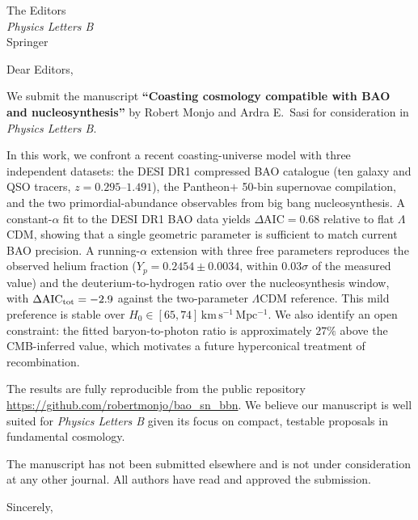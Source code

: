 \documentclass[12pt,a4paper]{letter}
\date{September 2026}
\begin{document}
\begin{letter}{The Editors\\
  \textit{Physics Letters B}\\
  Springer}

\opening{Dear Editors,}

We submit the manuscript \textbf{``Coasting cosmology compatible with BAO and nucleosynthesis''} by Robert Monjo and Ardra E.\ Sasi for consideration in \textit{Physics Letters B}.

In this work, we confront a recent coasting-universe model with three independent datasets: the DESI
DR1 compressed BAO catalogue (ten galaxy and QSO tracers, $z=0.295$--$1.491$), the Pantheon$+$ 50-bin supernovae compilation, and the two primordial-abundance
observables from big bang nucleosynthesis. A constant-$\alpha$ fit to the DESI
DR1 BAO data yields $\Delta\mathrm{AIC}=0.68$ relative to flat $\Lambda$CDM,
showing that a single geometric parameter is sufficient to match current BAO
precision. A running-$\alpha$ extension with three free parameters reproduces
the observed helium fraction ($Y_p=0.2454\pm0.0034$, within $0.03\sigma$ of the
measured value) and the deuterium-to-hydrogen ratio over the nucleosynthesis
window, with $\Delta\mathrm{AIC}_{\rm tot}=-2.9$ against the two-parameter
$\Lambda$CDM reference. This mild preference is stable over
$H_0\in[65,74]\,\mathrm{km\,s^{-1}\,Mpc^{-1}}$. We also identify an open
constraint: the fitted baryon-to-photon ratio is approximately $27\%$ above the
CMB-inferred value, which motivates a future hyperconical treatment of
recombination.

The results are fully reproducible from the public repository \url{https://github.com/robertmonjo/bao_sn_bbn}.
We believe our manuscript is well suited for \textit{Physics Letters B} given its
focus on compact, testable proposals in fundamental cosmology.

The manuscript has not been submitted elsewhere and is not under consideration at any other journal. All authors have read and approved the submission.

\closing{Sincerely,}

\end{letter}
\end{document}
